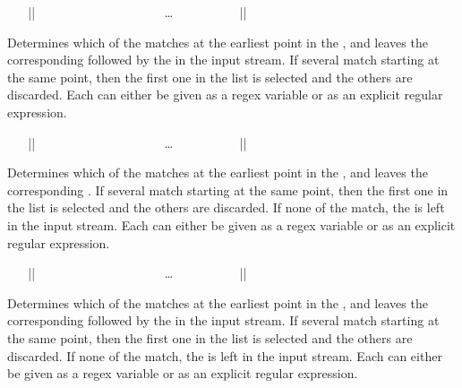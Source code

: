 \documentclass[oneside]{book}
\begin{document}
\begin{function}{\regexMatchCaseT}
\begin{syntax}
~ ~ |{|
~ ~ ~ ~  
~ ~ ~ ~  
~ ~ ~ ~ \ldots
~ ~ ~ ~  
~ ~ |}| 
~ ~ 
\end{syntax}
Determines which of the  matches at the
earliest point in the , and leaves the
corresponding  followed by the  in the
input stream. If several  match starting at the same
point, then the first one in the list is selected and the others are
discarded. Each  can either be given
as a regex variable or as an explicit regular expression.
\end{function}

\begin{function}{\regexMatchCaseF}
\begin{syntax}
~ ~ |{|
~ ~ ~ ~  
~ ~ ~ ~  
~ ~ ~ ~ \ldots
~ ~ ~ ~  
~ ~ |}| 
~ ~ 
\end{syntax}
Determines which of the  matches at the
earliest point in the , and leaves the
corresponding .
If several  match starting at the same
point, then the first one in the list is selected and the others are
discarded.  If none of the  match, the 
is left in the input stream.  Each  can either be given
as a regex variable or as an explicit regular expression.
\end{function}

\begin{function}{\regexMatchCaseTF}
\begin{syntax}
~ ~ |{|
~ ~ ~ ~  
~ ~ ~ ~  
~ ~ ~ ~ \ldots
~ ~ ~ ~  
~ ~ |}| 
~ ~  
\end{syntax}
Determines which of the  matches at the
earliest point in the , and leaves the
corresponding  followed by the  in the
input stream.  If several  match starting at the same
point, then the first one in the list is selected and the others are
discarded.  If none of the  match, the 
is left in the input stream.  Each  can either be given
as a regex variable or as an explicit regular expression.
\end{function}
\end{document}
